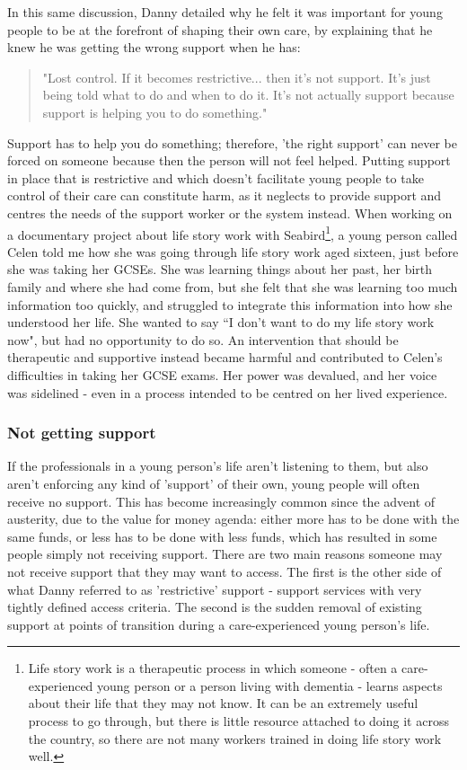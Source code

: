 In this same discussion, Danny detailed why he felt it was important for young people to be at the forefront of shaping their own care, by explaining that he knew he was getting the wrong support when he has:
\begin{quote}
"Lost control. If it becomes restrictive... then it's not support. It's just being told what to do and when to do it. It's not actually support because support is helping you to do something."
\end{quote}
Support has to help you do something; therefore, 'the right support' can never be forced on someone because then the person will not feel helped. Putting support in place that is restrictive and which doesn't facilitate young people to take control of their care can constitute harm, as it neglects to provide support and centres the needs of the support worker or the system instead.  When working on a documentary project about life story work with Seabird\footnote{Life story work is a therapeutic process in which someone - often a care-experienced young person or a person living with dementia - learns aspects about their life that they may not know. It can be an extremely useful process to go through, but there is little resource attached to doing it across the country, so there are not many workers trained in doing life story work well.}, a young person called Celen told me how she was going through life story work aged sixteen, just before she was taking her GCSEs. She was learning things about her past, her birth family and where she had come from, but she felt that she was learning too much information too quickly, and struggled to integrate this information into how she understood her life. She wanted to say “I don't want to do my life story work now", but had no opportunity to do so. An intervention that should be therapeutic and supportive instead became harmful and contributed to Celen’s difficulties in taking her GCSE exams. Her power was devalued, and her voice was sidelined - even in a process intended to be centred on her lived experience.

\subsubsection{Not getting support}
If the professionals in a young person's life aren't listening to them, but also aren’t enforcing any kind of 'support' of their own, young people will often receive no support. This has become increasingly common since the advent of austerity, due to the value for money agenda: either more has to be done with the same funds, or less has to be done with less funds, which has resulted in some people simply not receiving support. There are two main reasons someone may not receive support that they may want to access. The first is the other side of what Danny referred to as 'restrictive' support - support services with very tightly defined access criteria. The second is the sudden removal of existing support at points of transition during a care-experienced young person's life.

